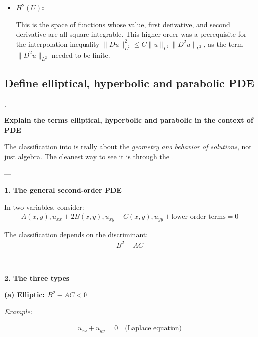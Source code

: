 \documentclass[12pt,a4paper]{report}
\begin{document}
\begin{description}
\begin{itemize}
\begin{itemize}
    \item \textbf{\(H^2(U)\):} 
    
    This is the space of functions whose value, first derivative, and second derivative are all square-integrable. This higher-order  was a prerequisite for the interpolation inequality \(\|Du\|_{L^2}^2 \le C\|u\|_{L^2}\|D^2u\|_{L^2}\), as the term \(\|D^2u\|_{L^2}\) needed to be finite.

\end{itemize}
\end{itemize}

\HLINE
\newpage
\subsection*{Define elliptical, hyperbolic and parabolic PDE}.
\item \textbf{Explain the terms elliptical, hyperbolic and parabolic in the context of PDE}

The classification into  is really about the \textit{geometry and behavior of solutions}, not just algebra. The cleanest way to see it is through the .

---
\begin{description}

\item \textbf{1. The general second-order PDE}

In two variables, consider:
\begin{align*}
A(x,y),u_{xx} + 2B(x,y),u_{xy} + C(x,y),u_{yy} + \text{lower-order terms} = 0
\end{align*}

The classification depends on the discriminant:
\begin{align*}
\boxed{B^2 - AC}
\end{align*}

---

\item \textbf{2. The three types}

\begin{description}
\item \textbf{(a) Elliptic: $B^2 - AC < 0$}
\begin{description}
\item \textit{Example:}

\begin{align*}
u_{xx} + u_{yy} = 0 \quad \text{(Laplace equation)}
\end{align*}


\end{description}
\end{description}
\end{description}
\end{description}
\end{document}
